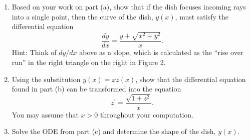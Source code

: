 \documentclass[12pt,letterpaper]{hmcpset}
\begin{document}
\begin{problem}[7]
\begin{enumerate}
    \item Based on your work on part (a), show that if the dish focuses
    incoming rays into a single point, then the curve of the dish,
    $y(x)$, must satisfy the differential equation
    \[
    \frac{dy}{dx} = \frac{y+\sqrt{x^2+y^2}}{x}.
    \]
    Hint:  Think of $dy/dx$ above as a slope, which is calculated as the ``rise over run'' in the right triangle on the right in Figure 2.
    \item  Using the substitution $y(x) = xz(x)$, show that the differential equation found in part (b) can be transformed into the equation
    \[
    z^\prime = \frac{\sqrt{1+z^2}}{x}.
    \]
    You may assume that $x>0$ throughout your computation.
    \item Solve the ODE from part (c) and determine the shape of the dish, $y(x)$.
  \end{enumerate}
\end{problem}
\newpage
\begin{solution}
  \null\vfill
\end{solution}
\end{document}
